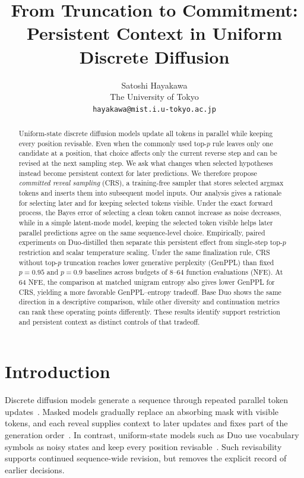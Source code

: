 \documentclass{article}
\title{From Truncation to Commitment:\\
Persistent Context in Uniform Discrete Diffusion}
\author{
  Satoshi Hayakawa \\
  The University of Tokyo \\
  \texttt{hayakawa@mist.i.u-tokyo.ac.jp}
}
\newcommand{\1}{\mathbf 1}
\newcommand{\CRS}{\textsc{CRS}}
\theoremstyle{definition}
\begin{document}
\raggedbottom

\maketitle
\begin{abstract}
Uniform-state discrete diffusion models update all tokens in parallel while
keeping every position revisable. Even when the commonly used top-$p$
rule leaves only one candidate at a position, that choice affects
only the current reverse step and can be revised at the next sampling step. We ask
what changes when selected hypotheses instead become persistent context for
later predictions. We therefore propose \emph{committed reveal sampling}
(\CRS), a training-free sampler that stores selected
argmax tokens and inserts them into subsequent model inputs.
Our analysis gives a rationale for selecting later and for keeping selected
tokens visible. Under the exact forward process, the Bayes error of selecting a
clean token cannot increase as noise decreases, while in a simple latent-mode
model, keeping the selected token visible helps
later parallel predictions agree on the same sequence-level choice.
Empirically, paired experiments on Duo-distilled then separate
this persistent effect from single-step top-$p$ restriction and scalar
temperature scaling. Under the same finalization rule, \CRS{} without top-$p$
truncation reaches lower generative perplexity (GenPPL) than fixed $p=0.95$ and
$p=0.9$ baselines across budgets of 8--64 function evaluations (NFE). At 64 NFE, the
comparison at matched unigram entropy also gives lower GenPPL for \CRS{},
yielding a more favorable GenPPL--entropy tradeoff. Base Duo shows the same
direction in a descriptive comparison, while other diversity and continuation
metrics can rank these operating points differently. These results identify support
restriction and persistent context as distinct controls of that tradeoff.
\end{abstract}

\section{Introduction}
\label{sec:intro}

Discrete diffusion models generate a sequence through repeated parallel token
updates~\citep{austin2021structured,campbell2022continuous,lou2024discrete,
sahoo2024simple}. Masked models gradually replace an absorbing mask with visible
tokens, and each reveal supplies context to later updates and fixes part of the
generation order~\citep{chang2022maskgit,hayakawa2026demystifying}. In contrast,
uniform-state models such as Duo use vocabulary symbols as noisy states and
keep every position revisable~\citep{sahoo2025duo}. Such revisability supports
continued sequence-wide revision, but removes the explicit record of earlier
decisions.
\end{document}
